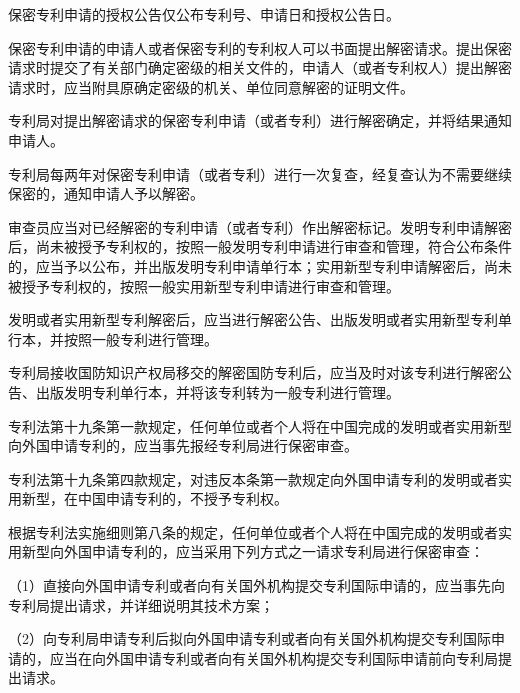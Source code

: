保密专利申请的授权公告仅公布专利号、申请日和授权公告日。

保密专利申请的申请人或者保密专利的专利权人可以书面提出解密请求。提出保密请求时提交了有关部门确定密级的相关文件的，申请人（或者专利权人）提出解密请求时，应当附具原确定密级的机关、单位同意解密的证明文件。

专利局对提出解密请求的保密专利申请（或者专利）进行解密确定，并将结果通知申请人。

专利局每两年对保密专利申请（或者专利）进行一次复查，经复查认为不需要继续保密的，通知申请人予以解密。

审查员应当对已经解密的专利申请（或者专利）作出解密标记。发明专利申请解密后，尚未被授予专利权的，按照一般发明专利申请进行审查和管理，符合公布条件的，应当予以公布，并出版发明专利申请单行本；实用新型专利申请解密后，尚未被授予专利权的，按照一般实用新型专利申请进行审查和管理。

发明或者实用新型专利解密后，应当进行解密公告、出版发明或者实用新型专利单行本，并按照一般专利进行管理。

专利局接收国防知识产权局移交的解密国防专利后，应当及时对该专利进行解密公告、出版发明专利单行本，并将该专利转为一般专利进行管理。

专利法第十九条第一款规定，任何单位或者个人将在中国完成的发明或者实用新型向外国申请专利的，应当事先报经专利局进行保密审查。

专利法第十九条第四款规定，对违反本条第一款规定向外国申请专利的发明或者实用新型，在中国申请专利的，不授予专利权。

根据专利法实施细则第八条的规定，任何单位或者个人将在中国完成的发明或者实用新型向外国申请专利的，应当采用下列方式之一请求专利局进行保密审查：

{\setlength{\parindent}{17.1bp}（1）直接向外国申请专利或者向有关国外机构提交专利国际申请的，应当事先向专利局提出请求，并详细说明其技术方案；\par}

{\setlength{\parindent}{17.1bp}（2）向专利局申请专利后拟向外国申请专利或者向有关国外机构提交专利国际申请的，应当在向外国申请专利或者向有关国外机构提交专利国际申请前向专利局提出请求。\par}

